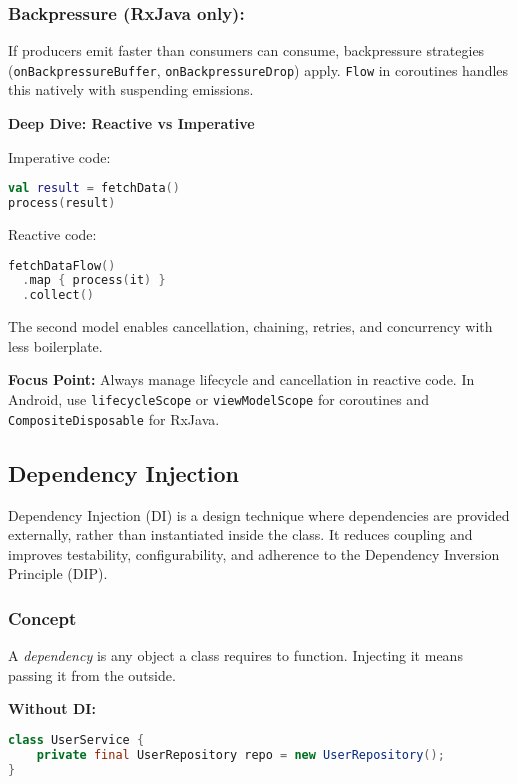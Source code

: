 \documentclass[a4paper,12pt]{article}
\begin{document}
\subsubsection{Backpressure (RxJava only):}
If producers emit faster than consumers can consume, backpressure strategies (\texttt{onBackpressureBuffer}, \texttt{onBackpressureDrop}) apply. \texttt{Flow} in coroutines handles this natively with suspending emissions.

\textbf{Deep Dive: Reactive vs Imperative}

Imperative code:
\begin{lstlisting}[language=Kotlin]
val result = fetchData()
process(result)
\end{lstlisting}

Reactive code:
\begin{lstlisting}[language=Kotlin]
fetchDataFlow()
  .map { process(it) }
  .collect()
\end{lstlisting}

The second model enables cancellation, chaining, retries, and concurrency with less boilerplate.

\textbf{Focus Point:} Always manage lifecycle and cancellation in reactive code. In Android, use \texttt{lifecycleScope} or \texttt{viewModelScope} for coroutines and \texttt{CompositeDisposable} for RxJava.


\subsection{Dependency Injection}

Dependency Injection (DI) is a design technique where dependencies are provided externally, rather than instantiated inside the class. It reduces coupling and improves testability, configurability, and adherence to the Dependency Inversion Principle (DIP).

\subsubsection{Concept}

A \textit{dependency} is any object a class requires to function. Injecting it means passing it from the outside.

\textbf{Without DI:}
\begin{lstlisting}[language=Java]
class UserService {
    private final UserRepository repo = new UserRepository();
}
\end{lstlisting}
\end{document}
